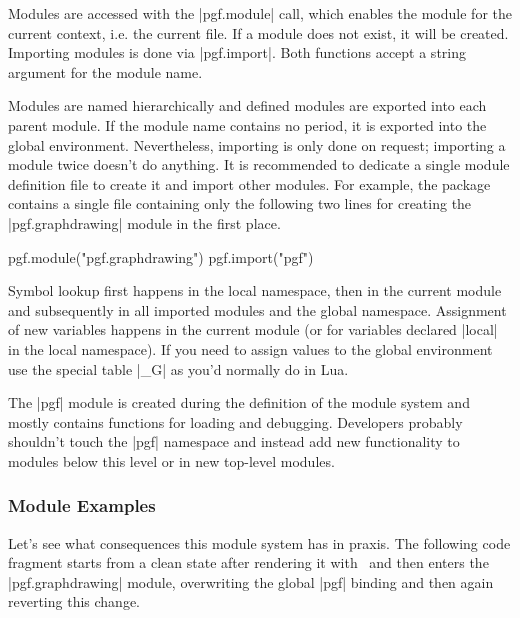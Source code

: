 Modules are accessed with the |pgf.module| call, which enables the
module for the current context, i.e. the current file. If a module
does not exist, it will be created.  Importing modules is done via
|pgf.import|.  Both functions accept a string argument for the
module name.

Modules are named hierarchically and defined modules are exported into
each parent module.  If the module name contains no period, it is
exported into the global environment.  Nevertheless, importing is only
done on request; importing a module twice doesn't do anything.
It is recommended to dedicate a single module definition file
to create it and import other modules.  For example, the package
contains a single file containing only the following two lines for
creating the |pgf.graphdrawing| module in the first place.

\begin{codeexample}
pgf.module("pgf.graphdrawing")
pgf.import("pgf")
\end{codeexample}

Symbol lookup first happens in the local namespace, then in the
current module and subsequently in all imported modules and the global
namespace.  Assignment of new variables happens in the current module
(or for variables declared |local| in the local namespace).  If you
need to assign values to the global environment use the special table
|_G| as you'd normally do in Lua.

The |pgf| module is created during the definition of the module system
and mostly contains functions for loading and debugging.  Developers
probably shouldn't touch the |pgf| namespace and instead add new
functionality to modules below this level or in new top-level
modules.

\subsubsection{Module Examples}
Let's see what consequences this module system has in praxis.  The
following code fragment starts from a clean state after rendering it
with \LuaTeX\ and then enters the |pgf.graphdrawing| module,
overwriting the global |pgf| binding and then again reverting this
change.

